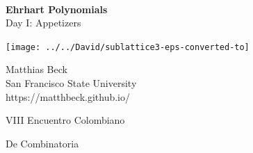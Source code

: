 \documentclass[landscape]{foils}
\def\green{\color{green}}
\def\blue{\color{blue}}
\def\black{\color{black}}
\begin{document}
\setlength{\parindent}{0pt}
\setlength{\parskip}{1cm}

\def\hopen{\mathbb{H}}
\def\Z{\mathbb{Z}}
\def\Q{\mathbb{Q}}
\def\R{\mathbb{R}}
\def\C{\mathcal{C}}
\def\F{\mathcal{F}}
\def\G{\mathcal{G}}
\def\P{\mathcal{P}}
\def\cQ{\mathcal{Q}}
\def\K{\mathcal{K}}
\def\cZ{\mathcal{Z}}
\def\m{\mathbf{m}}
\def\v{\mathbf{v}}
\def\w{\mathbf{w}}
\def\z{\mathbf{z}}
\newcommand\cone{\operatorname{cone}} 
\newcommand\conv{\operatorname{conv}} 
\newcommand\vol{\operatorname{vol}} 
\newcommand\stir{\operatorname{stirl}}
\newcommand\Ehr{\operatorname{Ehr}} 
\newcommand\fl[1]{\left\lfloor {#1} \right\rfloor} 
\newcommand\fr[1]{\left\{ {#1} \right\}} 
\newcommand\Chat{\widehat{\K}}
\newcommand\PPhat{{\widehat{\Pi}}}
\newcommand\Ccheck{\widecheck{\K}}
\newcommand\PPcheck{\widecheck{\Pi}}

\def\headercolor{\green}


\thispagestyle{empty}
\

\begin{center}
  {\green\LARGE \textbf{Ehrhart Polynomials} \\[12pt]
\normalsize
Day I: Appetizers}
\end{center}

\vspace{-.2in}
\texttt{[image: ../../David/sublattice3-eps-converted-to]}

\vspace{-4.5in} 
\blue
\hspace{5in}
Matthias Beck
\\[5pt]
\black
\hspace{5in}
San Francisco State University
\\[5pt]
\blue
\hspace{5in}
https://matthbeck.github.io/
\black

\vspace{1in} 
\hspace{5in}
VIII Encuentro Colombiano 

\vspace{-.4in} 
\hspace{5in}
De Combinatoria

\black

\newpage
\[  \] 

\vspace{1.5cm} 
\end{document}
